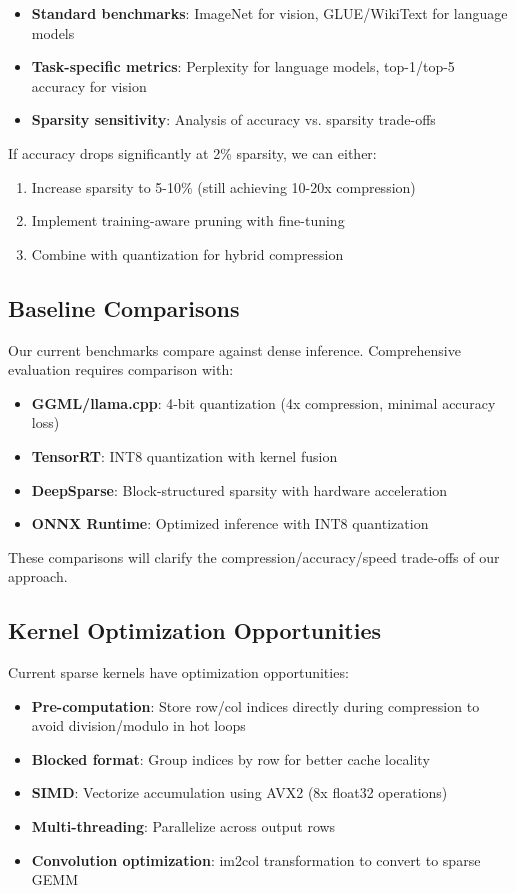 \documentclass[11pt]{article}
\begin{document}
\begin{itemize}
    \item \textbf{Standard benchmarks}: ImageNet for vision, GLUE/WikiText for language models
    \item \textbf{Task-specific metrics}: Perplexity for language models, top-1/top-5 accuracy for vision
    \item \textbf{Sparsity sensitivity}: Analysis of accuracy vs. sparsity trade-offs
\end{itemize}

If accuracy drops significantly at 2\% sparsity, we can either:
\begin{enumerate}
    \item Increase sparsity to 5-10\% (still achieving 10-20x compression)
    \item Implement training-aware pruning with fine-tuning
    \item Combine with quantization for hybrid compression
\end{enumerate}

\subsection{Baseline Comparisons}

Our current benchmarks compare against dense inference. Comprehensive evaluation requires comparison with:

\begin{itemize}
    \item \textbf{GGML/llama.cpp}: 4-bit quantization (4x compression, minimal accuracy loss)
    \item \textbf{TensorRT}: INT8 quantization with kernel fusion
    \item \textbf{DeepSparse}: Block-structured sparsity with hardware acceleration
    \item \textbf{ONNX Runtime}: Optimized inference with INT8 quantization
\end{itemize}

These comparisons will clarify the compression/accuracy/speed trade-offs of our approach.

\subsection{Kernel Optimization Opportunities}

Current sparse kernels have optimization opportunities:

\begin{itemize}
    \item \textbf{Pre-computation}: Store row/col indices directly during compression to avoid division/modulo in hot loops
    \item \textbf{Blocked format}: Group indices by row for better cache locality
    \item \textbf{SIMD}: Vectorize accumulation using AVX2 (8x float32 operations)
    \item \textbf{Multi-threading}: Parallelize across output rows
    \item \textbf{Convolution optimization}: im2col transformation to convert to sparse GEMM
\end{itemize}
\end{document}
